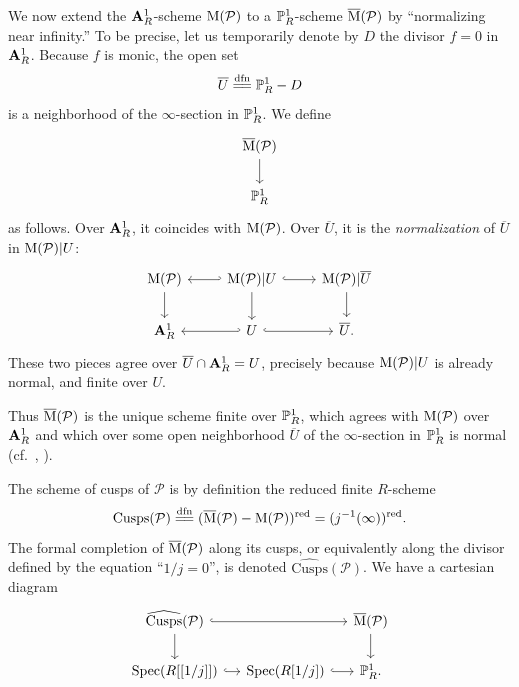 \kmitem\label{item:8.6.3}
We now extend the $\mathbf{A}^1_R$-scheme $\mathrm{M}(\mathcal{P})$ to a $\mathbb{P}^1_R$-scheme $\overline{\mathrm{M}}(\mathcal{P})$ by ``normalizing near infinity.'' To be precise, let us temporarily denote by $D$ the divisor $f = 0$ in $\mathbf{A}^1_R$. Because $f$ is monic, the open set
\[
\overline{U} \xlongequal{\mathrm{dfn}} \PP^1_R - D
\]
is a neighborhood of the $\infty$-section in $\mathbb{P}^1_R$. We define
\[
\begin{tikzcd}
\overline{\Mcoarse}(\mathcal{P}) \arrow[d] \\
\PP^1_R
\end{tikzcd}
\]
as follows. Over $\mathbf{A}^1_R$, it coincides with $\mathrm{M}(\mathcal{P})$. Over $\overline{U}$, it is the \emph{normalization} of $\overline{U}$ in $\mathrm{M}(\mathcal{P})|U$:
\begin{equation}\label{eq:8.6.3.1}
\begin{tikzcd}[column sep=normal]
\Mcoarse(\mathcal{P}) \arrow[d] & \Mcoarse(\mathcal{P})|U \arrow[l, hook'] \arrow[r, hook] \arrow[d] & \Mcoarse(\mathcal{P})|\overline{U} \arrow[d] \\
\Aff^1_R & U \arrow[l, hook'] \arrow[r, hook] & \overline{U} .
\end{tikzcd}
\end{equation}
These two pieces agree over $\overline{U} \cap \mathbf{A}^1_R = U$, precisely because $\mathrm{M}(\mathcal{P})|U$ is already normal, and finite over $U$.

Thus $\overline{\mathrm{M}}(\mathcal{P})$ is the unique scheme finite over $\mathbb{P}^1_R$, which agrees with $\mathrm{M}(\mathcal{P})$ over $\mathbf{A}^1_R$ and which over some open neighborhood $\overline{U}$ of the $\infty$-section in $\mathbb{P}^1_R$ is normal (cf.\ \cite[36.6]{Nag}, \cite[IV, 7.8.3, (vi)]{EGA}).

The scheme of cusps of $\mathcal{P}$ is by definition the reduced finite $R$-scheme
\begin{equation}\label{eq:8.6.3.2}
\mathrm{Cusps}(\mathcal{P}) \xlongequal{\mathrm{dfn}} (\overline{\Mcoarse}(\mathcal{P}) - \Mcoarse(\mathcal{P}))^{\mathrm{red}} = (j^{-1}(\infty))^{\mathrm{red}} .
\end{equation}
The formal completion of $\overline{\mathrm{M}}(\mathcal{P})$ along its cusps, or equivalently along the divisor defined by the equation ``$1/j = 0$'', is denoted $\widehat{\mathrm{Cusps}}(\mathcal{P})$. We have a cartesian diagram
\begin{equation}\label{eq:8.6.3.3}
\begin{tikzcd}[column sep=small]
\widehat{\mathrm{Cusps}}(\mathcal{P}) \arrow[rr, hook] \arrow[d] & & \overline{\Mcoarse}(\mathcal{P}) \arrow[d] \\
\Spec(R[[1/j]]) \arrow[r, hook] & \Spec(R[1/j]) \arrow[r, hook] & \PP^1_R .
\end{tikzcd}
\end{equation}

